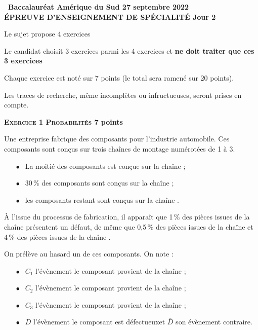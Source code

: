 \documentclass[11pt]{article}
\begin{document}
\setlength\parindent{0mm}
\pagestyle{fancy}
\thispagestyle{empty}

\begin{center}{\Large\textbf{\decofourleft~Baccalauréat Amérique du Sud 27 septembre 2022~\decofourright\\[6pt] ÉPREUVE D'ENSEIGNEMENT DE SPÉCIALITÉ Jour 2}}
\end{center}

\vspace{0,25cm}

Le sujet propose 4 exercices

Le candidat choisit 3 exercices parmi les 4 exercices et \textbf{ne doit traiter que ces 3 exercices}

\medskip

Chaque exercice est noté sur 7 points (le total sera ramené sur 20 points).

Les traces de recherche, même incomplètes ou infructueuses, seront prises en compte.

\bigskip

\textbf{\textsc{Exercice 1 Probabilités} \hfill 7 points}

\medskip

Une entreprise fabrique des composants pour l'industrie automobile. Ces composants sont conçus sur trois chaînes de montage numérotées de 1 à 3.
\begin{itemize}
\item[$\bullet~~$] La moitié des composants est conçue sur la chaîne  ;
\item[$\bullet~~$]  30\,\% des composants sont conçus sur la chaîne ;
\item[$\bullet~~$]  les composants restant sont conçus sur la chaîne .
\end{itemize}

À l'issue du processus de fabrication, il apparaît que 1\,\% des pièces issues de la chaîne  présentent un défaut, de même que 0,5\,\% des pièces issues de la chaîne  et 4\,\% des pièces issues de la chaîne .

On prélève au hasard un de ces composants. On note :

\begin{itemize}
\item[$\bullet~~$] $C_1$ l'évènement \og le composant provient de la chaîne  \fg{} ;
\item[$\bullet~~$] $C_2$ l'évènement \og le composant provient de la chaîne  \fg{} ;
\item[$\bullet~~$] $C_3$ l'évènement \og le composant provient de la chaîne  \fg{} ;
\item[$\bullet~~$] $D$ l'évènement \og le composant est défectueux\fg et $\overline{D}$ son évènement contraire.
\end{itemize}
\end{document}
